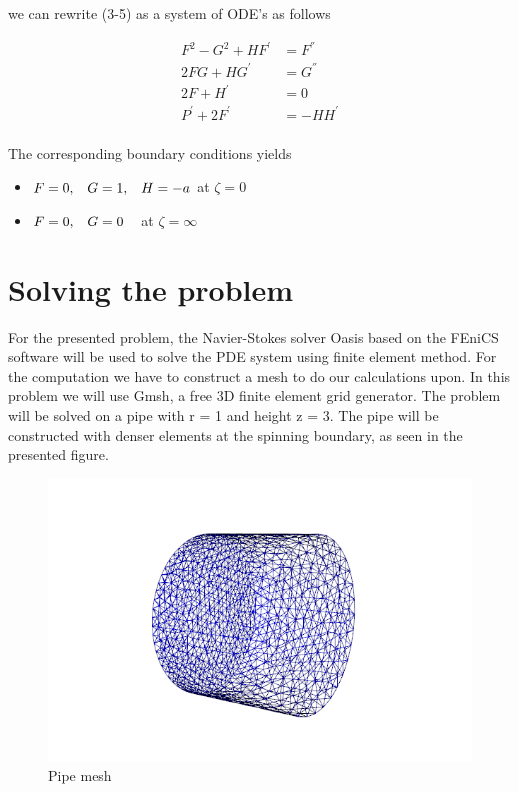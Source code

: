 \documentclass[a4paper,norsk]{article}
\begin{document}
we can rewrite (3-5) as a system of ODE's as follows

\begin{align}
F^2 - G^2 + HF^{'} &= F^{''} \\
2FG + HG^{'} &= G^{''} \\
2F + H^{'} &= 0 \\
P^{'} +2F^{'} &= -HH^{'} \\
\end{align}

The corresponding boundary conditions yields

\begin{itemize}
\item $F = 0, \hspace{3mm} G = 1, \hspace{3mm} H = -a$ \hspace{3mm} at $\zeta = 0 $
\item $F = 0, \hspace{3mm} G = 0 \hspace{3mm}$ at $\zeta = \infty $
\end{itemize}

\section*{Solving the problem}
For the presented problem, the Navier-Stokes solver Oasis based on the FEniCS software will be used
to solve the PDE system using finite element method. \newline
For the computation we have to construct a mesh to do our calculations upon. In this problem we will use
Gmsh, a free 3D finite element grid generator. The problem will be solved on a pipe with r = 1 and height
z = 3. The pipe will be constructed with denser elements at the spinning boundary, as seen in the presented
figure.

\begin{figure}[h!]
	\centering
	\caption*{Pipe mesh}
	\includegraphics[scale=0.6]{pipe.png}
\end{figure}
\end{document}
